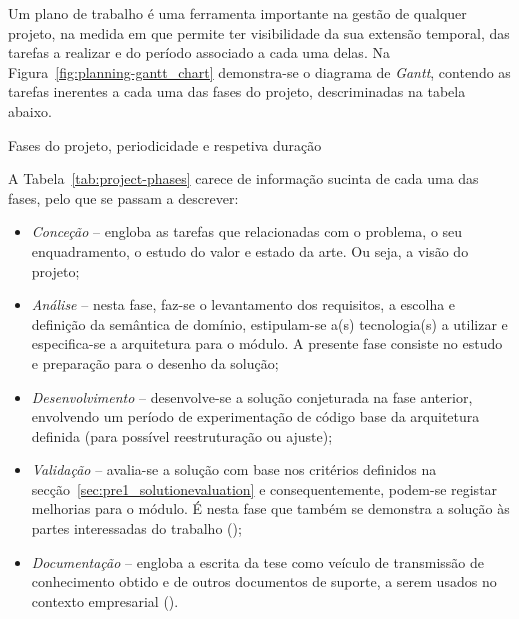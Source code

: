 Um plano de trabalho é uma ferramenta importante na gestão de qualquer projeto, na medida em que permite ter visibilidade da sua extensão temporal, das tarefas a realizar e do período associado a cada uma delas. Na Figura~\ref{fig:planning-gantt_chart} demonstra-se o diagrama de \textit{Gantt}, contendo as tarefas inerentes a cada uma das fases do projeto, descriminadas na tabela abaixo.

\begin{table}[!ht]
\caption{Fases do projeto, periodicidade e respetiva duração}
\label{tab:project-phases}
\centering
\resizebox{\textwidth}{!}{}
\end{table}

A Tabela~\ref{tab:project-phases} carece de informação sucinta de cada uma das fases, pelo que se passam a descrever:

\begin{itemize}
    \item 
    {
        \textit{Conceção} -- engloba as tarefas que relacionadas com o problema, o seu enquadramento, o estudo do valor e estado da arte. Ou seja, a visão do projeto;
    }
    \item
    {
        \textit{Análise} -- nesta fase, faz-se o levantamento dos requisitos, a escolha e definição da semântica de domínio, estipulam-se a(s) tecnologia(s) a utilizar e especifica-se a arquitetura para o módulo. A presente fase consiste no estudo e preparação para o desenho da solução; 
    }
    \item
    {
        \textit{Desenvolvimento} -- desenvolve-se a solução conjeturada na fase anterior, envolvendo um período de experimentação de código base da arquitetura definida (para possível reestruturação ou ajuste);
    }
    \item
    {
        \textit{Validação} -- avalia-se a solução com base nos critérios definidos na secção~\ref{sec:pre1_solutionevaluation} e consequentemente, podem-se registar melhorias para o módulo. É nesta fase que também se demonstra a solução às partes interessadas do trabalho ();
    }
    \item
    {
        \textit{Documentação} -- engloba a escrita da tese como veículo de transmissão de conhecimento obtido e de outros documentos de suporte, a serem usados no contexto empresarial ().
    }
\end{itemize}

